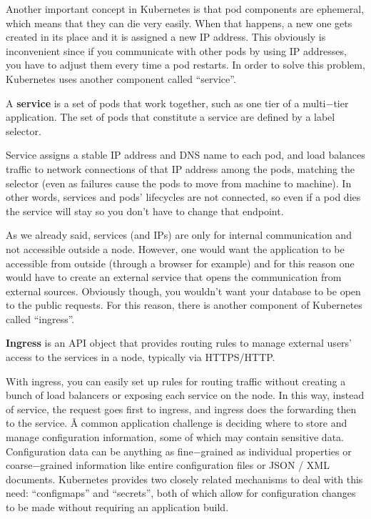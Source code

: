 
Another important concept in Kubernetes is that pod components are ephemeral, which means that they can die very
easily. When that happens, a new one gets created in its place and it is assigned a new IP address. This obviously is
inconvenient since if you communicate with other pods by using IP addresses, you have to adjust them every time a pod
restarts. In order to solve this problem, Kubernetes uses another component called ``service''.

\bd[Service]
A \textbf{service} is a set of pods that work together, such as one tier of a multi$-$tier application. The set of
pods that constitute a service are defined by a label selector.
\ed

Service assigns a stable IP address and DNS name to each pod, and load balances traffic to network connections of
that IP address among the pods, matching the selector (even as failures cause the pods to move from machine to
machine). In other words, services and pods' lifecycles are not connected, so even if a pod dies the service will
stay so you don't have to change that endpoint.


As we already said, services (and IPs) are only for internal communication and not accessible outside a node.
However, one would want the application to be accessible from outside (through a browser for example) and for this
reason one would have to create an external service that opens the communication from external sources. Obviously
though, you wouldn't want your database to be open to the public requests. For this reason, there is another
component of Kubernetes called ``ingress''.

\bd[Ingress]
\textbf{Ingress} is an API object that provides routing rules to manage external users' access to the services in a
node, typically via HTTPS/HTTP.
\ed


With ingress, you can easily set up rules for routing traffic without creating a bunch of load balancers or exposing
each service on the node. In this way, instead of service, the request goes first to ingress, and ingress does the
forwarding then to the service. \v

A common application challenge is deciding where to store and manage configuration information, some of which may
contain sensitive data. Configuration data can be anything as fine$-$grained as individual properties or
coarse$-$grained information like entire configuration files or JSON / XML documents. Kubernetes provides two closely
related mechanisms to deal with this need: ``configmaps'' and ``secrets'', both of which allow for configuration
changes to be made without requiring an application build.


